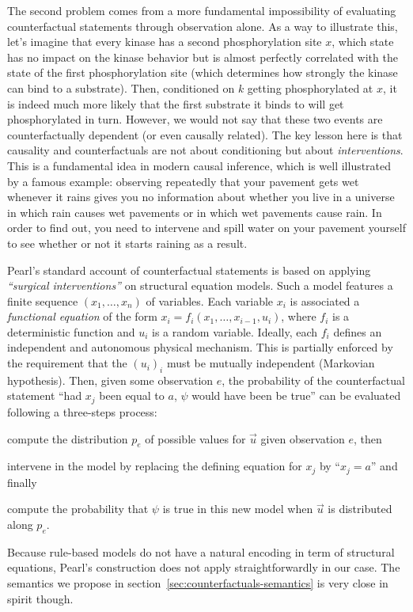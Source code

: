 The second problem comes from a more fundamental impossibility of
evaluating counterfactual statements through observation alone. As a
way to illustrate this, let's imagine that every kinase has a second
phosphorylation site $x$, which state has no impact on the kinase
behavior but is almost perfectly correlated with the state of the
first phosphorylation site (which determines how strongly the kinase
can bind to a substrate). Then, conditioned on $k$ getting
phosphorylated at $x$, it is indeed much more likely that the first
substrate it binds to will get phosphorylated in turn. However, we
would not say that these two events are counterfactually dependent (or
even causally related). The key lesson here is that causality and
counterfactuals are not about conditioning but about
\emph{interventions}. This is a fundamental idea in modern causal
inference, which is well illustrated by a famous example: observing
repeatedly that your pavement gets wet whenever it rains gives you no
information about whether you live in a universe in which rain causes
wet pavements or in which wet pavements cause rain. In order to find
out, you need to intervene and spill water on your pavement yourself
to see whether or not it starts raining as a result.

Pearl's standard account of counterfactual statements is based on
applying \textit{``surgical interventions''} on structural equation
models. Such a model features a finite sequence $(x_1, \dots, x_n)$ of
variables. Each variable $x_i$ is associated a \emph{functional
  equation} of the form $x_i = f_i(x_1, \dots, x_{i-1}, u_i)$, where
$f_i$ is a deterministic function and $u_i$ is a random
variable. Ideally, each $f_i$ defines an independent and autonomous
physical mechanism. This is partially enforced by the requirement that
the $(u_i)_i$ must be mutually independent (Markovian
hypothesis). Then, given some observation $e$, the probability of the
counterfactual statement ``had $x_j$ been equal to $a$, $\psi$ would
have been be true'' can be evaluated following a three-steps process:
\begin{inparaenum}[]
\item \ItAbduction{} compute the distribution $p_e$ of possible values for
  $\vec u$ given observation $e$, then
\item \ItAction{} intervene in the model by replacing the
  defining equation for $x_j$ by ``$x_j = a$'' and finally
\item \ItPrediction{} compute the probability that $\psi$ is true in this
  new model when $\vec{u}$ is distributed along $p_e$.
\end{inparaenum}
Because rule-based models do not have a natural encoding in term of
structural equations, Pearl's construction does not apply
straightforwardly in our case. The semantics we propose in
section~\ref{sec:counterfactuals-semantics} is very close in spirit
though.



